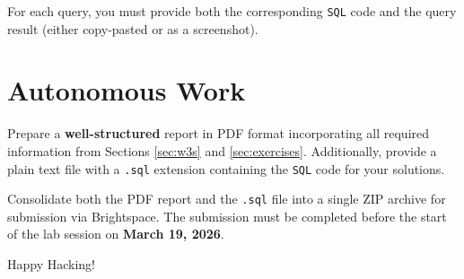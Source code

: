 \documentclass{article}
\begin{document}
For each query, you must provide both the corresponding \texttt{SQL} code and the query result (either copy-pasted or as a screenshot).

\section{Autonomous Work}

Prepare a \textbf{well-structured} report in PDF format incorporating all required information from Sections \ref{sec:w3s} and \ref{sec:exercises}. Additionally, provide a plain text file with a \texttt{.sql} extension containing the \texttt{SQL} code for your solutions.

Consolidate both the PDF report and the \texttt{.sql} file into a single ZIP archive for submission via Brightspace\texttrademark. The submission must be completed before the start of the lab session on \textbf{March 19, 2026}.

\vspace{5mm}
Happy Hacking! 
\end{document}
